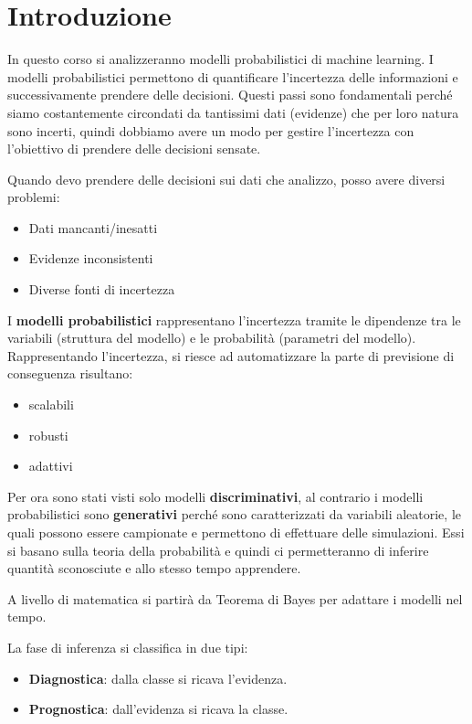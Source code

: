 \chapter{Introduzione}
In questo corso si analizzeranno modelli probabilistici di machine learning.
I modelli probabilistici permettono di quantificare l'incertezza delle informazioni
e successivamente prendere delle decisioni. Questi passi sono fondamentali perché
siamo costantemente circondati da tantissimi dati (evidenze) che per loro natura sono incerti,
quindi dobbiamo avere un modo per gestire l'incertezza con l'obiettivo di prendere 
delle decisioni sensate.

Quando devo prendere delle decisioni sui dati che analizzo, posso avere diversi
problemi:
\begin{itemize}
    \item Dati mancanti/inesatti
    \item Evidenze inconsistenti
    \item Diverse fonti di incertezza
\end{itemize}

I \textbf{modelli probabilistici} rappresentano l'incertezza tramite le dipendenze
tra le variabili (struttura del modello) e le probabilità (parametri del modello).
Rappresentando l'incertezza, si riesce ad automatizzare la parte di previsione
di conseguenza risultano:
\begin{itemize}
    \item scalabili
    \item robusti
    \item adattivi
\end{itemize}

Per ora sono stati visti solo modelli \textbf{discriminativi}, al contrario i
modelli probabilistici sono \textbf{generativi} perché sono caratterizzati da
variabili aleatorie, le quali possono essere campionate e permettono di effettuare
delle simulazioni. Essi si basano sulla teoria della probabilità e quindi ci
permetteranno di inferire quantità sconosciute e allo stesso tempo apprendere.

A livello di matematica si partirà da Teorema di Bayes per adattare i modelli
nel tempo.

La fase di inferenza si classifica in due tipi:
\begin{itemize}
    \item \textbf{Diagnostica}: dalla classe si ricava l'evidenza.
    \item \textbf{Prognostica}: dall'evidenza si ricava la classe.
\end{itemize}

